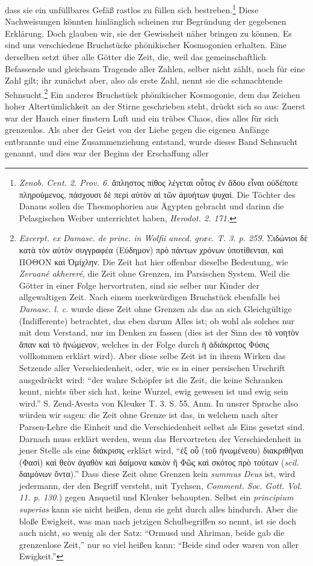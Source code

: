\documentclass[a4paper, 11pt, oneside]{article}
\begin{document}
dass sie ein unfüllbares Gefäß rastlos zu füllen sich bestreben.\footnote{\emph{Zenob. Cent. 2. Prov. 6.} ἄπληστος πίθος λέγεται οὗτος ἐν ἄδου εἶναι οὐδέποτε πληροὐμενος, πάσχουσι δὲ περὶ αὐτὸν αἱ τῶν ἀμυήτων ψυχαί. Die Töchter des Danaus sollen die Thesmophorien aus Ägypten gebracht und darinn die Pelasgischen Weiber unterrichtet haben, \emph{Herodot. 2. 171.}} Diese Nachweisungen könnten hinlänglich scheinen zur Begründung der gegebenen Erklärung. Doch glauben wir, sie der Gewissheit näher bringen zu können. Es sind uns verschiedene Bruchstücke phönikischer Kosmogonien erhalten. Eine derselben setzt über alle Götter die Zeit, die, weil das gemeinschaftlich Befassende und gleichsam Tragende aller Zahlen, selber nicht zählt, noch für eine Zahl gilt; ihr zunächst aber, also als erste Zahl, nennt sie die schmachtende Sehnsucht.\footnote{\emph{Excerpt. ex Damasc. de princ. in Wolfii anecd. græc. T. 3. p. 259.} Σιδώνιοι δὲ κατὰ τὸν αὐτὸν συγγραφέα (Εύδημον) πρὸ πάντων χρόνων ὑποτίθενται, καὶ ΠΟΘΟΝ καὶ Ὁμίχλην. Die Zeit hat hier offenbar dieselbe Bedeutung, wie \emph{Zeruané akhereré}, die Zeit ohne Grenzen, im Parsischen System. Weil die Götter in einer Folge hervortraten, sind sie selber nur Kinder der allgewaltigen Zeit. Nach einem merkwürdigen Bruchstück ebenfalls bei \emph{Damasc. l. c.} wurde diese Zeit ohne Grenzen als das an sich Gleichgültige (Indifferente) betrachtet, das eben darum Alles ist; ob wohl als solches nur mit dem Verstand, nur im Denken zu fassen (dies ist der Sinn des τὸ νοητὸν ἅπαν καὶ τὸ ἡνώμενον, welches in der Folge durch ἡ ἀδιάκριτος Φύσις vollkommen erklärt wird). Aber diese selbe Zeit ist in ihrem Wirken das Setzende aller Verschiedenheit, oder, wie es in einer persischen Urschrift ausgedrückt wird: "`der wahre Schöpfer ist die Zeit, die keine Schranken kennt, nichts über sich hat, keine Wurzel, ewig gewesen ist und ewig sein wird."' S. Zend-Avesta von Kleuker T. 3. S. 55. Anm. In unsrer Sprache also würden wir sagen: die Zeit ohne Grenze ist das, in welchem nach alter Parsen-Lehre die Einheit und die Verschiedenheit selbst als Eins gesetzt sind. Darnach muss erklärt werden, wenn das Hervortreten der Verschiedenheit in jener Stelle als eine διάκρισις erklärt wird, "`ἐξ οὗ (τοῠ ἡνωμένεου) διακριθῆναι (Φασὶ) καὶ θεὸν ἀγαθὸν καὶ δαίμονα κακὸν ἢ Φῶς καὶ σκότος πρὸ τούτων (\emph{scil.} δαιμόνων ὄντα)."' Dass diese Zeit ohne Grenzen kein \emph{summus Deus} ist, wird jedermann, der den Begriff versteht, mit Tychsen, \emph{Comment. Soc. Gott. Vol. 11. p. 130.}) gegen Anquetil und Kleuker behaupten. Selbst ein \emph{principium superias} kann sie nicht heißen, denn sie geht durch alles hindurch. Aber die bloße Ewigkeit, was man nach jetzigen Schulbegriffen so nennt, ist sie doch auch nicht, so wenig als der Satz: "`Ormusd und Ahriman, beide gab die grenzenlose Zeit,"' nur so viel heißen kann: "`Beide sind oder waren von aller Ewigkeit."'} Ein anderes Bruchstück phönikischer Kosmogonie, dem das Zeichen hoher Altertümlichkeit an der Stirne geschrieben steht, drückt sich so aus: Zuerst war der Hauch einer finstern Luft und ein trübes Chaos, dies alles für sich grenzenlos. Als aber der Geist von der Liebe gegen die eigenen Anfänge entbrannte und eine Zusammenziehung entstand, wurde dieses Band Sehnsucht genannt, und dies war der Beginn der Erschaffung aller 
\end{document}
